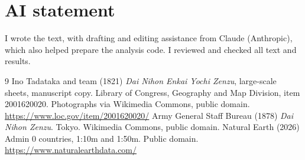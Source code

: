 \documentclass[11pt,a4paper]{article}
\begin{document}
\section*{AI statement}
I wrote the text, with drafting and editing assistance from Claude (Anthropic), which also helped prepare the analysis code. I reviewed and checked all text and results.

\begin{thebibliography}{9}
 Ino Tadataka and team (1821) \textit{Dai Nihon Enkai Yochi Zenzu}, large-scale sheets, manuscript copy. Library of Congress, Geography and Map Division, item 2001620020. Photographs via Wikimedia Commons, public domain. \url{https://www.loc.gov/item/2001620020/}
 Army General Staff Bureau (1878) \textit{Dai Nihon Zenzu}. Tokyo. Wikimedia Commons, public domain.
 Natural Earth (2026) Admin 0 countries, 1:10m and 1:50m. Public domain. \url{https://www.naturalearthdata.com/}
\end{thebibliography}

\clearpage
\appendix
\end{document}
